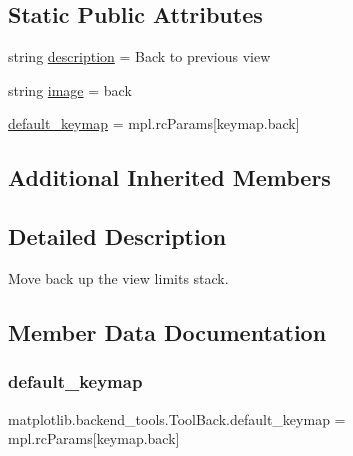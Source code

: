 \subsection*{Static Public Attributes}
\begin{DoxyCompactItemize}
\item 
string \hyperlink{classmatplotlib_1_1backend__tools_1_1ToolBack_ac46ec213c0db289624a0c735b350a509}{description} = \textquotesingle{}Back to previous view\textquotesingle{}
\item 
string \hyperlink{classmatplotlib_1_1backend__tools_1_1ToolBack_a5431412174b1cf63f83f52c360953f76}{image} = \textquotesingle{}back\textquotesingle{}
\item 
\hyperlink{classmatplotlib_1_1backend__tools_1_1ToolBack_acfee928c59fe5ae357b769d8317e6221}{default\+\_\+keymap} = mpl.\+rc\+Params\mbox{[}\textquotesingle{}keymap.\+back\textquotesingle{}\mbox{]}
\end{DoxyCompactItemize}
\subsection*{Additional Inherited Members}


\subsection{Detailed Description}
\begin{DoxyVerb}Move back up the view limits stack.\end{DoxyVerb}
 

\subsection{Member Data Documentation}
\mbox{\label{classmatplotlib_1_1backend__tools_1_1ToolBack_acfee928c59fe5ae357b769d8317e6221}} 
\subsubsection{\texorpdfstring{default\+\_\+keymap}{default\_keymap}}
{\footnotesize\ttfamily matplotlib.\+backend\+\_\+tools.\+Tool\+Back.\+default\+\_\+keymap = mpl.\+rc\+Params\mbox{[}\textquotesingle{}keymap.\+back\textquotesingle{}\mbox{]}\hspace{0.3cm}{\ttfamily [static]}}

